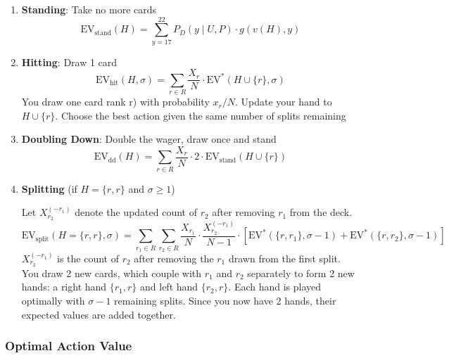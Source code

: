 \documentclass[12pt,a4paper]{cibb}
\begin{document}
\begin{enumerate}
    \item \textbf{Standing}: Take no more cards
    \begin{equation}
        \mathrm{EV}_{\text{stand}}(H) = \sum_{y=17}^{22} P_D(y \mid U, P) \cdot g(v(H), y)
        \label{eq:EV_STAND}
    \end{equation}

    \item \textbf{Hitting}: Draw 1 card
    \begin{equation}
          \mathrm{EV}_{\text{hit}}(H, σ  ) = \sum_{r \in R} \frac{X_r}{N} \cdot \mathrm{EV}^*(H \cup \{r\}, σ  )
        \label{eq:EV_HIT}
    \end{equation}
You draw one card rank r) with probability \(x_r/N\).
Update your hand to \(H \cup \{r\}\). Choose the best action given the same number of splits remaining

    \item \textbf{Doubling Down}: Double the wager, draw once and stand
    \begin{equation}
        \mathrm{EV}_{\text{dd}}(H) = \sum_{r \in R} \frac{X_r}{N} \cdot 2 \cdot \mathrm{EV}_{\text{stand}}(H \cup \{r\})
        \label{eq:EV_DOUBLE}
    \end{equation}

\item \textbf{Splitting} (if $H = \{r, r\}$ and $\sigma \geq 1$)

  Let $X_{r_2}^{(-r_1)}$ denote the updated count of $r_2$ after removing $r_1$ from the deck.
  \begin{equation}
    \mathrm{EV}_{\text{split}}(H = \{r, r\}, \sigma ) = \sum_{r_1 \in R} \sum_{r_2 \in R} \frac{X_{r_1}}{N} \cdot \frac{X_{r_2}^{(-r_1)}}{N - 1} \cdot \left[ \mathrm{EV}^*(\{r, r_1\}, \sigma - 1) + \mathrm{EV}^*(\{r, r_2\}, \sigma - 1) \right]
    \label{eq:EV_SPLIT}
  \end{equation}
  $X_{r_2}^{(-r_1)}$ is the count of $r_2$ after removing the $r_1$ drawn from the first split.
  You draw 2 new cards, which couple with $r_1$ and $r_2$ separately to form 2 new hands: a right hand $\{r_1, r\}$ and left hand $\{r_2, r\}$.
  Each hand is played optimally with $\sigma - 1$ remaining splits. Since you now have 2 hands, their expected values are added together.
\end{enumerate}
\subsubsection{Optimal Action Value}
\end{document}
